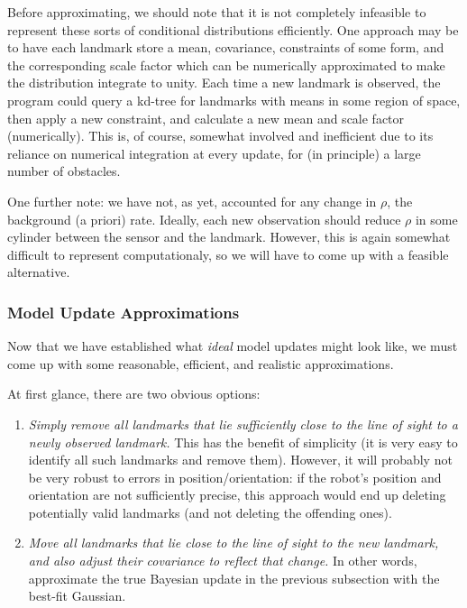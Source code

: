 \documentclass[12pt]{article}
\begin{document}
Before approximating, we should note that it is not completely infeasible to represent these sorts of conditional distributions efficiently. One approach may be to have each landmark store a mean, covariance, constraints of some form, and the corresponding scale factor which can be numerically approximated to make the distribution integrate to unity. Each time a new landmark is observed, the program could query a kd-tree for landmarks with means in some region of space, then apply a new constraint, and calculate a new mean and scale factor (numerically). This is, of course, somewhat involved and inefficient due to its reliance on numerical integration at every update, for (in principle) a large number of obstacles.

One further note: we have not, as yet, accounted for any change in $\rho$, the background (a priori) rate. Ideally, each new observation should reduce $\rho$ in some cylinder between the sensor and the landmark. However, this is again somewhat difficult to represent computationaly, so we will have to come up with a feasible alternative.

\subsubsection{Model Update Approximations}

Now that we have established what \textit{ideal} model updates might look like, we must come up with some reasonable, efficient, and realistic approximations.

At first glance, there are two obvious options:
\begin{enumerate}
\item \textit{Simply remove all landmarks that lie sufficiently close to the line of sight to a newly observed landmark.} This has the benefit of simplicity (it is very easy to identify all such landmarks and remove them). However, it will probably not be very robust to errors in position/orientation: if the robot's position and orientation are not sufficiently precise, this approach would end up deleting potentially valid landmarks (and not deleting the offending ones).
\item \textit{Move all landmarks that lie close to the line of sight to the new landmark, and also adjust their covariance to reflect that change.} In other words, approximate the true Bayesian update in the previous subsection with the best-fit Gaussian.
\end{enumerate}
\end{document}
